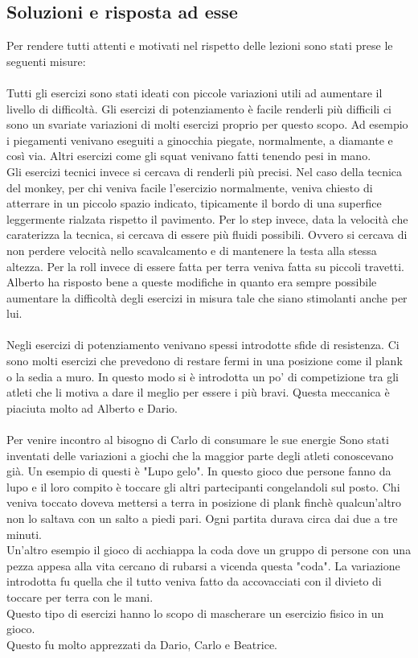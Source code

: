 \subsection{Soluzioni e risposta ad esse}

Per rendere tutti attenti e motivati nel rispetto delle lezioni sono stati prese le seguenti misure: \\
\\
Tutti gli esercizi sono stati ideati con piccole variazioni utili ad aumentare il livello di difficoltà. Gli esercizi di potenziamento è facile renderli più difficili ci sono un svariate variazioni di molti esercizi proprio per questo scopo. Ad esempio i piegamenti venivano eseguiti a ginocchia piegate, normalmente, a diamante e così via. Altri esercizi come gli squat venivano fatti tenendo pesi in mano. \\
Gli esercizi tecnici invece si cercava di renderli più precisi. Nel caso della tecnica del monkey, per chi veniva facile l'esercizio normalmente, veniva chiesto di atterrare in un piccolo spazio indicato, tipicamente il bordo di una superfice leggermente rialzata rispetto il pavimento. Per lo step invece, data la velocità che caraterizza la tecnica, si cercava di essere più fluidi possibili. Ovvero si cercava di non perdere velocità nello scavalcamento e di mantenere la testa alla stessa altezza. Per la roll invece di essere fatta per terra veniva fatta su piccoli travetti.\\
Alberto ha risposto bene a queste modifiche in quanto era sempre possibile aumentare la difficoltà degli esercizi in misura tale che siano stimolanti anche per lui.\\
\\
Negli esercizi di potenziamento venivano spessi introdotte sfide di resistenza. Ci sono molti esercizi che prevedono di restare fermi in una posizione come il plank o la sedia a muro. In questo modo si è introdotta un po' di competizione tra gli atleti che li motiva a dare il meglio per essere i più bravi. Questa meccanica è piaciuta molto ad Alberto e Dario.\\
\\
Per venire incontro al bisogno di Carlo di consumare le sue energie Sono stati inventati delle variazioni a giochi che la maggior parte degli atleti conoscevano già. Un esempio di questi è "Lupo gelo". In questo gioco due persone fanno da lupo e il loro compito è toccare gli altri partecipanti congelandoli sul posto. Chi veniva toccato doveva mettersi a terra in posizione di plank finchè qualcun'altro non lo saltava con un salto a piedi pari. Ogni partita durava circa dai due a tre minuti. \\
Un'altro esempio il gioco di acchiappa la coda dove un gruppo di persone con una pezza appesa alla vita cercano di rubarsi a vicenda questa "coda". La variazione introdotta fu quella che il tutto veniva fatto da accovacciati con il divieto di toccare per terra con le mani.\\
Questo tipo di esercizi hanno lo scopo di mascherare un esercizio fisico in un gioco.\\
Questo fu molto apprezzati da Dario, Carlo e Beatrice.\\

